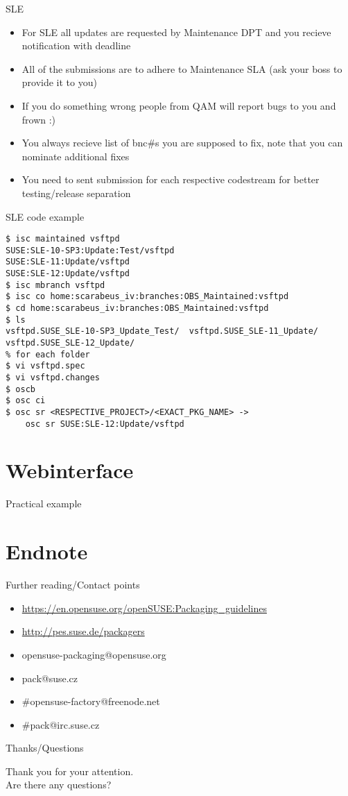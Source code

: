 \documentclass{beamer}
\begin{document}
\begin{frame}[t]{SLE}
	\begin{itemize}
	\item For SLE all updates are requested by Maintenance DPT and you recieve notification with deadline
	\item All of the submissions are to adhere to Maintenance SLA (ask your boss to provide it to you)
	\item If you do something wrong people from QAM will report bugs to you and frown :)
	\item You always recieve list of bnc\#s you are supposed to fix, note that you can nominate additional fixes
	\item You need to sent submission for each respective codestream for better testing/release separation
	\end{itemize}
\end{frame}

\begin{frame}[fragile]{SLE code example}
	\begin{tiny}
	\begin{verbatim}
$ isc maintained vsftpd
SUSE:SLE-10-SP3:Update:Test/vsftpd
SUSE:SLE-11:Update/vsftpd
SUSE:SLE-12:Update/vsftpd
$ isc mbranch vsftpd
$ isc co home:scarabeus_iv:branches:OBS_Maintained:vsftpd
$ cd home:scarabeus_iv:branches:OBS_Maintained:vsftpd
$ ls
vsftpd.SUSE_SLE-10-SP3_Update_Test/  vsftpd.SUSE_SLE-11_Update/ vsftpd.SUSE_SLE-12_Update/
% for each folder
$ vi vsftpd.spec
$ vi vsftpd.changes
$ oscb
$ osc ci
$ osc sr <RESPECTIVE_PROJECT>/<EXACT_PKG_NAME> ->
	osc sr SUSE:SLE-12:Update/vsftpd
	\end{verbatim}
	\end{tiny}
\end{frame}

\section{Webinterface}

\begin{frame}{Practical example}
\end{frame}

\section{Endnote}

\begin{frame}[t]{Further reading/Contact points}
	\begin{itemize}
	\item \url{https://en.opensuse.org/openSUSE:Packaging\_guidelines}
	\item \url{http://pes.suse.de/packagers}
	\item opensuse-packaging@opensuse.org
	\item pack@suse.cz
	\item \#opensuse-factory@freenode.net 
	\item \#pack@irc.suse.cz
	\end{itemize}
\end{frame}

\begin{frame}{Thanks/Questions}
	\begin{center}
	Thank you for your attention.\\
	Are there any questions?
	\end{center}
\end{frame}
\end{document}
